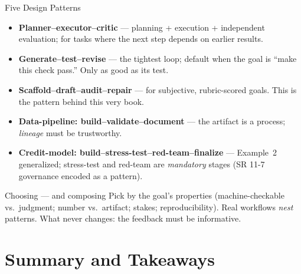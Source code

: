 \documentclass[9pt,t]{beamer}
\begin{document}
\begin{frame}{Five Design Patterns}

\begin{itemize}
  \item \textbf{Planner--executor--critic} --- planning + execution + independent
        evaluation; for tasks where the next step depends on earlier results.
  \item \textbf{Generate--test--revise} --- the tightest loop; default when the
        goal is ``make this check pass.'' Only as good as its test.
  \item \textbf{Scaffold--draft--audit--repair} --- for subjective, rubric-scored
        goals. \alert{This is the pattern behind this very book.}
  \item \textbf{Data-pipeline: build--validate--document} --- the artifact is a
        process; \emph{lineage} must be trustworthy.
  \item \textbf{Credit-model: build--stress-test--red-team--finalize} ---
        Example~2 generalized; stress-test and red-team are \emph{mandatory}
        stages (SR 11-7 governance encoded as a pattern).
\end{itemize}

\medskip
\begin{block}{Choosing --- and composing}
Pick by the goal's properties (machine-checkable vs.\ judgment; number vs.\
artifact; stakes; reproducibility). Real workflows \emph{nest} patterns. What
never changes: the feedback must be \alert{informative}.
\end{block}
\end{frame}

\section{Summary and Takeaways}
\end{document}
